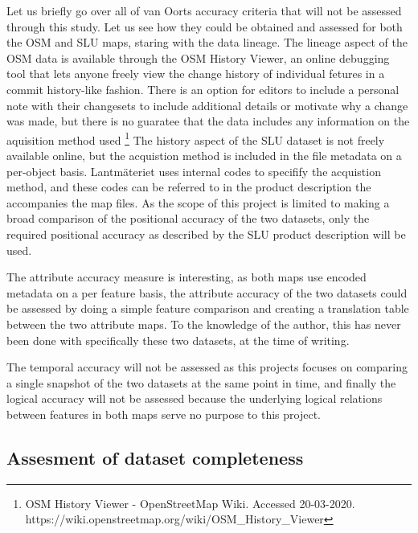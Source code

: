 \documentclass{kththesis}
\begin{document}
Let us briefly go over all of van Oorts accuracy criteria that will not be assessed through this study.
Let us see how they could be obtained and assessed for both the OSM and SLU maps, staring with the data lineage.
The lineage aspect of the OSM data is available through the OSM History Viewer, an online debugging tool that lets anyone freely view the change history of individual fetures in a commit history-like fashion.
There is an option for editors to include a personal note with their changesets to include additional details or motivate why a change was made, but there is no guaratee that the data includes any information on the aquisition method used \footnote{OSM History Viewer - OpenStreetMap Wiki. Accessed 20-03-2020. https://wiki.openstreetmap.org/wiki/OSM\_History\_Viewer}
The history aspect of the SLU dataset is not freely available online, but the acquistion method is included in the file metadata on a per-object basis.
Lantmäteriet uses internal codes to specifify the acquistion method, and these codes can be referred to in the product description the accompanies the map files.
As the scope of this project is limited to making a broad comparison of the positional accuracy of the two datasets, only the required positional accuracy as described by the SLU product description will be used.

The attribute accuracy measure is interesting, as both maps use encoded metadata on a per feature basis, the attribute accuracy of the two datasets could be assessed by doing a simple feature comparison and creating a translation table between the two attribute maps.
To the knowledge of the author, this has never been done with specifically these two datasets, at the time of writing.

The temporal accuracy will not be assessed as this projects focuses on comparing a single snapshot of the two datasets at the same point in time, and finally the logical accuracy will not be assessed because the underlying logical relations between features in both maps serve no purpose to this project.

\subsection{Assesment of dataset completeness}
\end{document}
